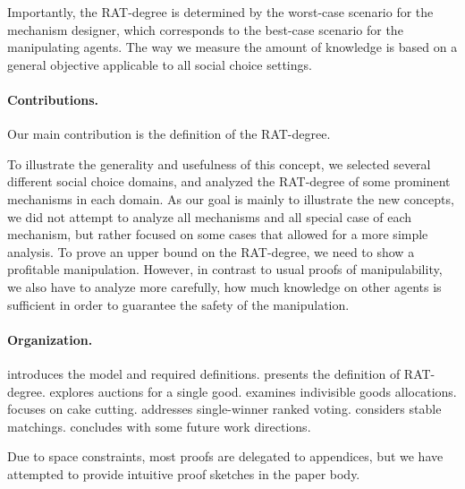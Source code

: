 Importantly, the RAT-degree is determined by the worst-case scenario for the mechanism designer, which corresponds to the best-case scenario for the manipulating agents.
The way we measure the amount of knowledge is based on a general objective applicable to all social choice settings.


\paragraph{Contributions.}
Our main contribution is the definition of the RAT-degree.


To illustrate the generality and usefulness of this concept, we selected several different social choice domains, and analyzed the RAT-degree of some prominent mechanisms in each domain.
As our goal is mainly to illustrate the new concepts, we did not attempt to analyze all mechanisms and all special case of each mechanism, but rather focused on some cases that allowed for a more simple analysis. 
%
To prove an upper bound on the RAT-degree, we need to show a profitable manipulation. However, in contrast to usual proofs of manipulability, we also have to analyze more carefully, how much knowledge on other agents is sufficient in order to guarantee the safety of the manipulation.


\paragraph{Organization.}  introduces the model and required definitions.  presents the definition of RAT-degree. 
%
 explores auctions for a single good.  examines indivisible goods allocations. 
 focuses on cake cutting.  
 addresses single-winner ranked voting.
 considers stable matchings.
 concludes with some future work directions.

Due to space constraints, most proofs are delegated to appendices, but we have attempted to provide intuitive proof sketches in the paper body.

